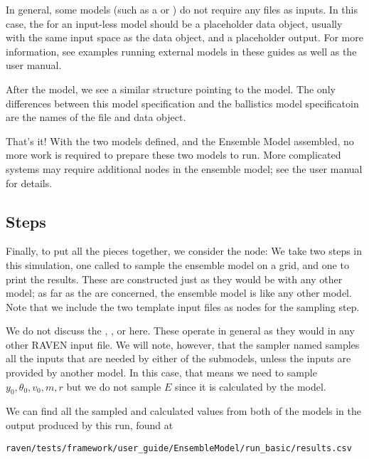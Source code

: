 In general, some models (such as a  or ) do not require any files as
inputs.  In this case, the  for an input-less model should be a placeholder data object,
usually with the same input space as the  data object, and a placeholder output.
For more information, see examples running external models in these guides as well as the user manual.

After the  model, we see a similar structure pointing to the  model.
The only differences between this model specification and the ballistics model specificatoin are the names of
the  file and  data object.

That's it!  With the two models defined, and the Ensemble Model assembled, no more work is required to
prepare these two models to run.  More complicated systems may require additional nodes in the ensemble model;
see the user manual for details.

\subsection{Steps}
Finally, to put all the pieces together, we consider the  node:
We take two steps in this simulation, one  called  to sample the ensemble model on a grid,
and one  to print the results.  These are constructed just as they would be with any other
model; as far as the  are concerned, the ensemble model is like any other model.  Note that we
include the two template input files as  nodes for the sampling step.

We do not discuss the , , or 
here.  These operate in general as they would in any other RAVEN input file.  We will note, however, that the
 sampler named  samples all the inputs that are needed by either of the submodels,
unless the inputs are provided by another model.  In this case, that means we need to sample
$y_0,\theta_0,v_0,m,r$ but we do not sample $E$ since it is calculated by the  model.

We can find all the sampled and calculated values from both of the models in the output produced by this run,
found at
\begin{verbatim}
raven/tests/framework/user_guide/EnsembleModel/run_basic/results.csv
\end{verbatim}



